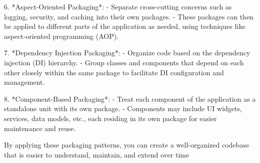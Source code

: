 6. *Aspect-Oriented Packaging*:
- Separate cross-cutting concerns such as logging, security, and caching into their own packages.
- These packages can then be applied to different parts of the application as needed, using techniques like aspect-oriented programming (AOP).

7. *Dependency Injection Packaging*:
- Organize code based on the dependency injection (DI) hierarchy.
- Group classes and components that depend on each other closely within the same package to facilitate DI configuration and management.

8. *Component-Based Packaging*:
- Treat each component of the application as a standalone unit with its own package.
- Components may include UI widgets, services, data models, etc., each residing in its own package for easier maintenance and reuse.

By applying these packaging patterns, you can create a well-organized codebase that is easier to understand, maintain, and extend over time